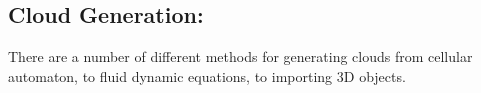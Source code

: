 \subsection{Cloud Generation:}
\label{sec:cg}
There are a number of different methods for generating clouds from cellular automaton, to fluid dynamic equations, to importing 3D objects.



